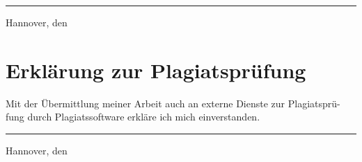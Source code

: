 \vspace{3cm}


\rule{6cm}{0.4pt} \hfill Hannover, den \theday\\
\theauthor
\vspace{5cm}

\section*{Erklärung zur Plagiatsprüfung}
Mit der Übermittlung meiner Arbeit auch an externe Dienste zur Plagiatsprü-fung durch
Plagiatssoftware erkläre ich mich einverstanden.

\vspace{3cm}


\rule{6cm}{0.4pt} \hfill Hannover, den \theday\\
\theauthor

\restoregeometry
